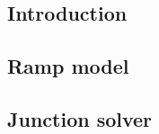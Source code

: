 
\label{sec:continuous_problem}
\subsection{Introduction}



\subsection{Ramp model}


\subsection{Junction solver}
\label{sec:junction_solver}
